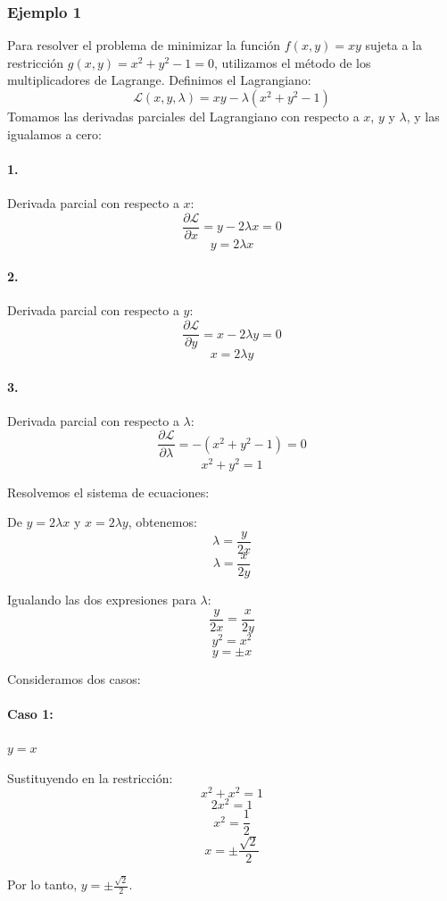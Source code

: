 \documentclass[11pt]{book}
\theoremstyle{definicion}
\theoremstyle{teorema}
\theoremstyle{ejemplo}
\begin{document}
\subsubsection{Ejemplo 1}

Para resolver el problema de minimizar la función \( f(x, y) = xy \) sujeta a la restricción \( g(x, y) = x^2 + y^2 - 1 = 0 \), utilizamos el método de los multiplicadores de Lagrange.
%
Definimos el Lagrangiano:
\[ \mathcal{L}(x, y, \lambda) = xy - \lambda (x^2 + y^2 - 1) \]
%
Tomamos las derivadas parciales del Lagrangiano con respecto a \(x\), \(y\) y \(\lambda\), y las igualamos a cero:

\paragraph{1.} Derivada parcial con respecto a \(x\):
\[ \frac{\partial \mathcal{L}}{\partial x} = y - 2 \lambda x = 0 \]
\[ y = 2 \lambda x \]

\paragraph{2.} Derivada parcial con respecto a \(y\):
\[ \frac{\partial \mathcal{L}}{\partial y} = x - 2 \lambda y = 0 \]
\[ x = 2 \lambda y \]

\paragraph{3.} Derivada parcial con respecto a \(\lambda\):
\[ \frac{\partial \mathcal{L}}{\partial \lambda} = -(x^2 + y^2 - 1) = 0 \]
\[ x^2 + y^2 = 1 \]

Resolvemos el sistema de ecuaciones:

De \( y = 2 \lambda x \) y \( x = 2 \lambda y \), obtenemos:
\[ \lambda = \frac{y}{2x} \]
\[ \lambda = \frac{x}{2y} \]

Igualando las dos expresiones para \(\lambda\):
\[ \frac{y}{2x} = \frac{x}{2y} \]
\[ y^2 = x^2 \]
\[ y = \pm x \]

Consideramos dos casos:

\paragraph{Caso 1:} \( y = x \)

Sustituyendo en la restricción:
\[ x^2 + x^2 = 1 \]
\[ 2x^2 = 1 \]
\[ x^2 = \frac{1}{2} \]
\[ x = \pm \frac{\sqrt{2}}{2} \]

Por lo tanto, \( y = \pm \frac{\sqrt{2}}{2} \).
\end{document}
